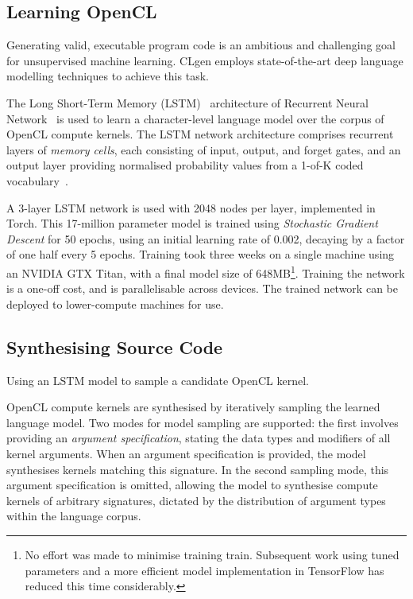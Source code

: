 \subsection{Learning OpenCL}
\label{sec:learning-opencl}

Generating valid, executable program code is an ambitious and challenging goal for unsupervised machine learning. CLgen employs state-of-the-art deep language modelling techniques to achieve this task.

The Long Short-Term Memory (LSTM)~\cite{Hochreiter1997} architecture of Recurrent Neural Network~\cite{Sundermeyer2012,Mikolov2015} is used to learn a character-level language model over the corpus of OpenCL compute kernels. The LSTM network architecture comprises recurrent layers of \emph{memory cells}, each consisting of input, output, and forget gates, and an output layer providing normalised probability values from a 1-of-K coded vocabulary~\cite{Graves2005}.

A 3-layer LSTM network is used with 2048 nodes per layer, implemented in Torch. This 17-million parameter model is trained using \textit{Stochastic Gradient Descent} for 50 epochs, using an initial learning rate of 0.002, decaying by a factor of one half every 5 epochs. Training took three weeks on a single machine using an NVIDIA GTX Titan, with a final model size of 648MB\footnote{No effort was made to minimise training train. Subsequent work using tuned parameters and a more efficient model implementation in TensorFlow has reduced this time considerably.}. Training the network is a one-off cost, and is parallelisable across devices. The trained network can be deployed to lower-compute machines for use.

\subsection{Synthesising Source Code}
\label{subsec:synthesizing-opencl}

\begin{algorithm}
	
	\caption[Sampling a candidate kernel from a seed text]{Using an LSTM model to sample a candidate OpenCL kernel.}
	\label{alg:clgen-synthesis}
\end{algorithm}

OpenCL compute kernels are synthesised by iteratively sampling the learned language model. Two modes for model sampling are supported: the first involves providing an \emph{argument specification}, stating the data types and modifiers of all kernel arguments. When an argument specification is provided, the model synthesises kernels matching this signature. In the second sampling mode, this argument specification is omitted, allowing the model to synthesise compute kernels of arbitrary signatures, dictated by the distribution of argument types within the language corpus.

